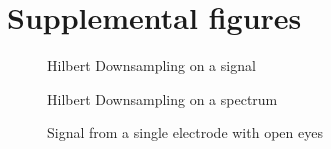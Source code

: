 \documentclass[9pt,twocolumn,twoside]{osajnl}
\begin{document}
\newpage

\section{Supplemental figures}

\begin{figure}[htbp]
\centering
{}
\caption{Hilbert Downsampling on a signal}
\label{fig:false-color}
\end{figure}

\begin{figure}[htbp]
\centering
{}
\caption{Hilbert Downsampling on a spectrum}
\label{fig:false-color}
\end{figure}



\begin{figure}[htbp]
\centering
{}
\caption{Signal from a single electrode with open eyes}
\label{fig:false-color}
\end{figure}
\end{document}
